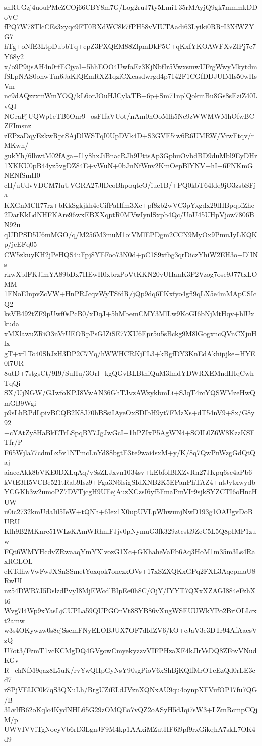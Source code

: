 shRUGzj4uouPMcZCOj66CBY8m7G/Log2ruJ7ty5LmiT35rMAyjQ9gk7mmmkDDoVC
fPQ7W78TlcCEs3xyqc9FT0BXdWC8k7fPH58vVIUTAadi63Lyiki0RRrI3XfWZYG7
hTg+oNfE3LtpDubbTq+epZ3PXQEM88ZlpmDkP5C+qKxfYKOAWFXvZlPj7c7Y68y2
x/o9P9ijsAH4n0rfECjyal+5hhEOO4UwfaEz3KjNbfIr5VwxsmwUFrgWwyMkytdm
fSLpNAS0ohwTm6JaKlQEmRXZ1qziCXeasdwrgd4p7142F1CGfDDJUIMIs50wHsVm
nc9dAQzzxmWmYOQ/kL6orJOuHJCylaTB+6p+Sm71nplQokmBu8Gs8sEziZ40LvQJ
NGraFjUQWp1eTB6Onr9+osFIfaVUot/nAm0hOoMlh5Ne9zWWMWMhOfwBCZFImsnz
zEPzaDqyEzkwRptSAjDlWSTqI0UpDVk4D+S3GVE5iw6R6UMRW/VrwFtqv/rMKwn/
gukYh/6lhwtM02fAga+I1y8hxJiBnacRJh9UttsAp3GphuOvbdBD9duMbl9EyDHr
1XKKU0pB44yz5vgDZ84E+vWuN+0bJnNfWnv2KmOepBlYNV+hI+6FNKmGNENfSmH0
cH/uUdvVDCM7luUVGRA27JlDcoBhpoqtcO/iue1B/+PQ0kbT64ldq9jO3zsbSFja
KXGnMClI77rz+bKkSgkjkh4eCifPaHfm3Xc+pf8zb2wVC3pYxgdx29lHBpqpiZhe
2DarKkLdNHFKAre96wxEBXXqptR0MVwIynlSxpb4Qc/UoU45UHpVjow7806BN92u
qUDPSD5U6mMGO/q/M256M3muM1oiVMlEPDgm2CCN9MyOx9PmuJyLKQKp/jcEFq05
CW5zkuyKH2jPeHQS4uFpj8YEFoo73N0d+pC1S9xfbg3qrDiczYhiW2EH3o+DlINs
rkwXbIFKJimYA89bDx7HEwH0xbrzPoVtKKN20vUHanK3P2Vzog7ose9J77txLOMM
1FNoEInpvZcVW+HnPRJcqvWyTSfdR/jQp9dq6FKxfyo4gfl9qLX5e4mMApCSIcQ2
ksVB492tZF9pUwf0sPcB0/xDqJ+5hMbemCMY3MlLw9KoGI6bNjMtHqv+hlUxkuda
xMXlawuZRiO3nVrUEORpPsGIZiSE77XU6Epr5u5sBckg9M8lGogxncQVnCXjuHlx
gT+xf1To40ShJzH3DP2C7Yq/hWWHCRKjFL3+kBgfDY3KnEdAkhipjke+HYE0l7UR
8utD+7stgsCt/9I9/SuHu/3Orl+kgQGvBLBtniQuM3lmdYDWRXEMndIHqCwhTqQi
SX/UjNGW/GJwfoKPJ8VwAN36GhTJvzAWzykbmLi+SJqT4rcYQSWMzeHwQmGB9Wgi
p9sLhRPdLpivBCQB2K8J70hBSsiIAyeOxSDIbH9yt7FMzXs+dT54nV9+8x/G8y92
+cYAtZy8HaBkETrLSpqBY7JgJwGcI+1hPZIxP5AgWN4+SOIL0Z6W8KzzKSFTfr/P
F65Wjla77cdmLx5v1NTmcLnYd88bgtE3te9wai4sxM+y/K/8q7QwPnWzgGdQtQaj
aiaecAkk8bVKE0DXLqAq/vSsZLJxvn1034sv+kEbfolBlXZvRn27JKpq6sc4aPb6
kVtE3H5VCBe521tRab9Isz9+Fga3N6lsigSIdXNB2K5EPanPhTAZ4+ntJytxwydb
YCGKb3w2umoPZ7DVTjcgH9UEejAuzXCzsI6yf5FmaPmVIr9sjkSYZCTI6oHncHUW
u0ic2732kmUdaIil5IeW+tQNh+6Iex1X0upUVLpWhwunjNwD193g1OAUgvDoBURU
Klh9B2MKnrc51WLsKAmWRhnlFJjv0pNymuG3fk329ztcsti9ZeC5L5Q8pIMP1zuw
FQt6WMYHcdvZRwaaqYmYXlvozG1Xc+GKhaheVaFb6Aq3HoM1m35m3Ls4RaxRGLOL
eKTdhwVwFwJXSnSSmetYoxqok7onezxOVs+17xSZXQKxGPq2FXL3AqepmaU8RwUI
nz54DWR7J5DslzdPvyI8MjEWcdlBIpEe0h8C/OjY/IYYT7QXxXZAGI884eFzhXt6
Wvg7l4Wp9xYasLjCUPLa59QUPGOnVt8SYB86vXugWSEUUWkYPo2BriOLLrxt2amw
w3s4OKywzw0s8cjSsemFNyELOBJUX7OF7dIdZV6/kO+cJaV3e3DTr94AfAaesVzQ
U7ot3/FzmT1vcKCMgDQ4GVgowCmyekyzzvVIFPHzaXF4kJlrVsDQ8ZFovVNudKGv
R+chNfM9qaz8L5uK/rvYwQHpGyNsY90sgPioV6xShBjKQlfMrOTeEzQd0rLE3cd7
rSPjVEIJC0k7qS3QXuLh/BrgUZiELdJVznXQNxAU9qu4oynpXFVufOP17fu7QG/B
3LvIfB62oKqlc4KydNHL65G29zOMQEo7vQZ2oASyH5dJqi7sW3+LZmRcmpCQjM/p
UWVIVViTgNoeyVb6rD3LgnJF9M4kp1AAxiMZutHF6l9pf9rxGikqhA7skL7OK4d9

